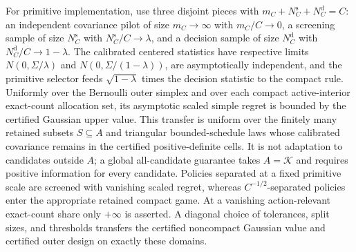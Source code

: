 For primitive implementation, use three disjoint pieces with \(m_C+N_C^{\mathrm s}+N_C^{\mathrm d}=C\): an independent covariance pilot of size \(m_C\to\infty\) with \(m_C/C\to0\), a screening sample of size \(N_C^{\mathrm s}\) with \(N_C^{\mathrm s}/C\to\lambda\), and a decision sample of size \(N_C^{\mathrm d}\) with \(N_C^{\mathrm d}/C\to1-\lambda\).  The calibrated centered statistics have respective limits \(N(0,\Sigma/\lambda)\) and \(N(0,\Sigma/(1-\lambda))\), are asymptotically independent, and the primitive selector feeds \(\sqrt{1-\lambda}\) times the decision statistic to the compact rule.  Uniformly over the Bernoulli outer simplex and over each compact active-interior exact-count allocation set, its asymptotic scaled simple regret is bounded by the certified Gaussian upper value.  This transfer is uniform over the finitely many retained subsets \(S\subseteq A\) and triangular bounded-schedule laws whose calibrated covariance remains in the certified positive-definite cells.  It is not adaptation to candidates outside \(A\); a global all-candidate guarantee takes \(A=\mathcal K\) and requires positive information for every candidate.  Policies separated at a fixed primitive scale are screened with vanishing scaled regret, whereas \(C^{-1/2}\)-separated policies enter the appropriate retained compact game.  At a vanishing action-relevant exact-count share only \(+\infty\) is asserted.  A diagonal choice of tolerances, split sizes, and thresholds transfers the certified noncompact Gaussian value and certified outer design on exactly these domains.